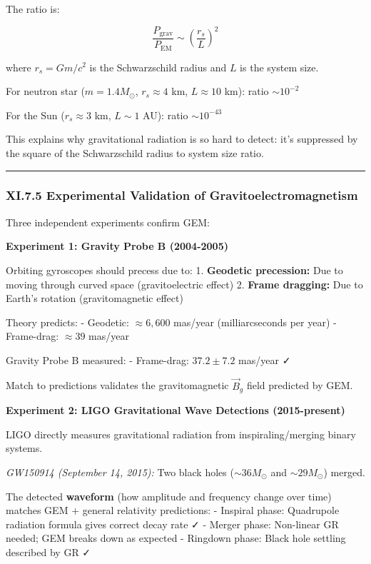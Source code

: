 \documentclass[
]{article}
\begin{document}
The ratio is:

\[\frac{P_{\text{grav}}}{P_{\text{EM}}} \sim \left(\frac{r_s}{L}\right)^2\]

where \(r_s = Gm/c^2\) is the Schwarzschild radius and \(L\) is the
system size.

For neutron star (\(m = 1.4 M_\odot\), \(r_s \approx 4\) km,
\(L \approx 10\) km): ratio \(\sim 10^{-2}\)

For the Sun (\(r_s \approx 3\) km, \(L \sim 1\) AU): ratio
\(\sim 10^{-43}\)

This explains why gravitational radiation is so hard to detect: it's
suppressed by the square of the Schwarzschild radius to system size
ratio.

\begin{center}\rule{0.5\linewidth}{0.5pt}\end{center}

\subsubsection{XI.7.5 Experimental Validation of
Gravitoelectromagnetism}\label{xi.7.5-experimental-validation-of-gravitoelectromagnetism}

Three independent experiments confirm GEM:

\textbf{Experiment 1: Gravity Probe B (2004-2005)}

Orbiting gyroscopes should precess due to: 1. \textbf{Geodetic
precession:} Due to moving through curved space (gravitoelectric effect)
2. \textbf{Frame dragging:} Due to Earth's rotation (gravitomagnetic
effect)

Theory predicts: - Geodetic: \(\approx 6,600\) mas/year (milliarcseconds
per year) - Frame-drag: \(\approx 39\) mas/year

Gravity Probe B measured: - Frame-drag: \(37.2 \pm 7.2\) mas/year ✓

Match to predictions validates the gravitomagnetic \(\vec{B}_g\) field
predicted by GEM.

\textbf{Experiment 2: LIGO Gravitational Wave Detections (2015-present)}

LIGO directly measures gravitational radiation from inspiraling/merging
binary systems.

\emph{GW150914 (September 14, 2015):} Two black holes
(\(\sim 36 M_\odot\) and \(\sim 29 M_\odot\)) merged.

The detected \textbf{waveform} (how amplitude and frequency change over
time) matches GEM + general relativity predictions: - Inspiral phase:
Quadrupole radiation formula gives correct decay rate ✓ - Merger phase:
Non-linear GR needed; GEM breaks down as expected - Ringdown phase:
Black hole settling described by GR ✓
\end{document}

